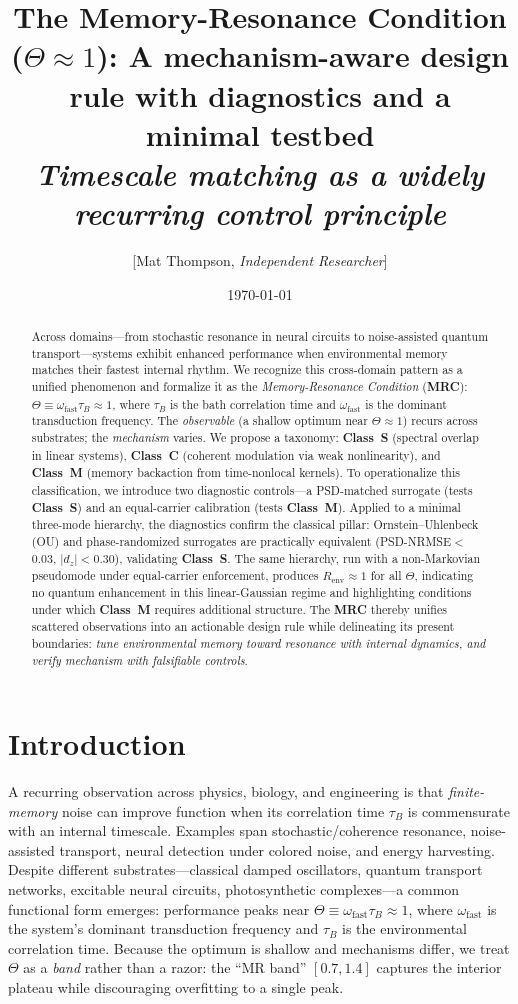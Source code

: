 \documentclass[11pt,letterpaper]{article}
\title{\bfseries\Large
The Memory-Resonance Condition ($\Theta\!\approx\!1$): A mechanism-aware design rule with diagnostics and a minimal testbed\\[0.35em]
\itshape\normalsize
Timescale matching as a widely recurring control principle}
\author{[Mat Thompson, \emph{Independent Researcher}]}
\date{\today}
\DeclareRobustCommand{\mrc}{\textbf{MRC}\xspace}
\DeclareRobustCommand{\classS}{\textbf{Class~S}\xspace}
\DeclareRobustCommand{\classC}{\textbf{Class~C}\xspace}
\DeclareRobustCommand{\classM}{\textbf{Class~M}\xspace}
\begin{document}
\maketitle

\begin{abstract}
Across domains---from stochastic resonance in neural circuits to noise-assisted quantum transport---systems exhibit enhanced performance when environmental memory matches their fastest internal rhythm. We recognize this cross-domain pattern as a unified phenomenon and formalize it as the \emph{Memory-Resonance Condition} (\mrc): $\Theta \equiv \omega_{\mathrm{fast}}\tau_B \approx 1$, where $\tau_B$ is the bath correlation time and $\omega_{\mathrm{fast}}$ is the dominant transduction frequency. The \emph{observable} (a shallow optimum near $\Theta\!\approx\!1$) recurs across substrates; the \emph{mechanism} varies. We propose a taxonomy: \classS{} (spectral overlap in linear systems), \classC{} (coherent modulation via weak nonlinearity), and \classM{} (memory backaction from time-nonlocal kernels). To operationalize this classification, we introduce two diagnostic controls---a PSD-matched surrogate (tests \classS) and an equal-carrier calibration (tests \classM). Applied to a minimal three-mode hierarchy, the diagnostics confirm the classical pillar: Ornstein--Uhlenbeck (OU) and phase-randomized surrogates are practically equivalent (PSD-NRMSE$<$0.03, $|d_z|<$0.30), validating \classS. The same hierarchy, run with a non-Markovian pseudomode under equal-carrier enforcement, produces $R_{\mathrm{env}}\approx 1$ for all $\Theta$, indicating no quantum enhancement in this linear-Gaussian regime and highlighting conditions under which \classM{} requires additional structure. The \mrc thereby unifies scattered observations into an actionable design rule while delineating its present boundaries: \emph{tune environmental memory toward resonance with internal dynamics, and verify mechanism with falsifiable controls}.
\end{abstract}

\section{Introduction}
A recurring observation across physics, biology, and engineering is that \emph{finite-memory} noise can improve function when its correlation time $\tau_B$ is commensurate with an internal timescale. Examples span stochastic/coherence resonance, noise-assisted transport, neural detection under colored noise, and energy harvesting. Despite different substrates---classical damped oscillators, quantum transport networks, excitable neural circuits, photosynthetic complexes---a common functional form emerges: performance peaks near $\Theta\equiv\omega_{\mathrm{fast}}\tau_B\approx 1$, where $\omega_{\mathrm{fast}}$ is the system's dominant transduction frequency and $\tau_B$ is the environmental correlation time. Because the optimum is shallow and mechanisms differ, we treat $\Theta$ as a \emph{band} rather than a razor: the ``MR band'' $[0.7,1.4]$ captures the interior plateau while discouraging overfitting to a single peak.
\end{document}
